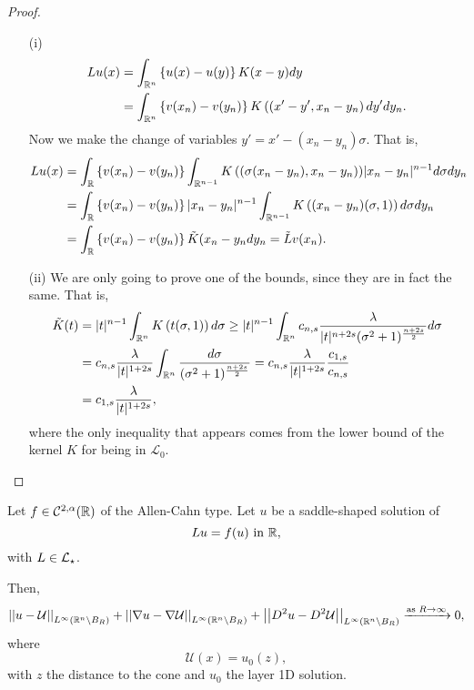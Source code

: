 \begin{proof}
	\begin{enumerate}
		\item[(i)]
		\begin{align*}
		Lu(x) &= \int_{\mathbb{R}^n} \left\{ u(x)-u(y) \right\} K(x-y) dy \\
		&=\int_{\mathbb{R}^n} \left\{ v(x_n)-v(y_n) \right\} K\left((x'-y',x_n-y_n\right) dy'dy_n.
		\end{align*}
		Now we make the change of variables $y' = x'-(x_n-y_n)\sigma$. That is,
		\begin{align*}
		Lu(x) &= \int_{\mathbb{R}} \left\{ v(x_n)-v(y_n) \right\} \int_{\mathbb{R}^{n-1}} K\left((\sigma(x_n-y_n),x_n-y_n\right)) |x_n-y_n|^{n-1} d\sigma dy_n \\
		&= \int_{\mathbb{R}} \left\{ v(x_n)-v(y_n) \right\} |x_n-y_n|^{n-1} \int_{\mathbb{R}^{n-1}} K\left((x_n-y_n)(\sigma,1)\right) d\sigma dy_n \\
		&= \int_{\mathbb{R}} \left\{ v(x_n)-v(y_n) \right\} \tilde{K}(x_n-y_n dy_n = \tilde{L}v(x_n). \\
		\end{align*}
		\item[(ii)] We are only going to prove one of the bounds, since they are in fact the same. That is,
		\begin{align*}
		\tilde{K}(t) &= |t|^{n-1} \int_{\mathbb{R}^n} K\left(t(\sigma,1)\right) d\sigma \geq |t|^{n-1} \int_{\mathbb{R}^n} c_{n,s} \frac{\lambda}{|t|^{n+2s}(\sigma^2+
			1)^{\frac{n+2s}{2}}} d\sigma \\
		&= c_{n,s} \frac{\lambda}{|t|^{1+2s}} \int_{\mathbb{R}^n} \frac{d\sigma}{(\sigma^2+1)^{\frac{n+2s}{2}}} = c_{n,s} \frac{\lambda}{|t|^{1+2s}} \frac{c_{1,s}}{c_{n,s}} \\
		&= c_{1,s} \frac{\lambda}{|t|^{1+2s}},
		\end{align*}
		where the only inequality that appears comes from the lower bound of the kernel $K$ for being in $\mathcal{L}_0$.
	\end{enumerate}
\end{proof}







\begin{theorem}
\label{Thm:AsymptoticBehaviourSaddleSolution}
Let $f\in \mathcal{C}^{2,\alpha}(\mathbb{R})$ of the Allen-Cahn type. Let $u$ be a saddle-shaped solution of
$$
Lu = f(u) \ \textrm{in } \R,
$$
with $L\in \mathcal{L}_\star$.

Then,
$$
\left | \left |{u-\mathcal{U}} \right | \right |_{L^\infty(\mathbb{R}^n\setminus B_R)}+\left | \left |{\nabla u-\nabla \mathcal{U}} \right | \right |_{L^\infty(\mathbb{R}^n\setminus B_R)}+\left | \left |{D^2u-D^2\mathcal{U}} \right | \right |_{L^\infty(\mathbb{R}^n\setminus B_R)} \xrightarrow{\text{as } R\to \infty}{} 0,
$$
where
$$
\mathcal{U}(x) = u_0(z),
$$
with $z$ the distance to the cone and $u_0$ the layer 1D solution.
\end{theorem}

